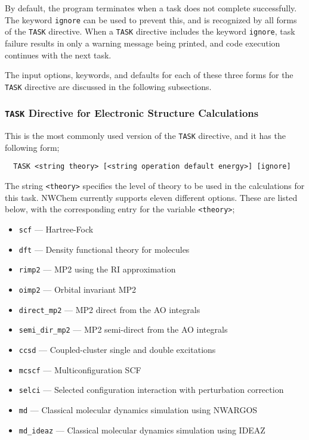 By default, the program terminates when a task does not complete
successfully.  The keyword \verb+ignore+ can be used to prevent this,
and is recognized by all forms of the \verb+TASK+ directive.  When a
\verb+TASK+ directive includes the keyword \verb+ignore+, task failure
results in only a warning message being printed, and code execution
continues with the next task.

The input options, keywords, and defaults for each of
these three forms for the \verb+TASK+ directive are discussed in the
following subsections.

\subsubsection{{\tt TASK} Directive for Electronic Structure Calculations}

This is the most commonly used version of the \verb+TASK+ directive, and
it has the following form;

\begin{verbatim}
  TASK <string theory> [<string operation default energy>] [ignore]
\end{verbatim}

The string \verb+<theory>+ specifies the level of theory to be used in the
calculations for this task.  NWChem currently supports eleven different
options.  These are listed below, with the corresponding entry for 
the variable {\tt <theory>};
\begin{itemize}
 \item \verb+scf+ --- Hartree-Fock
 \item \verb+dft+ --- Density functional theory for molecules
 \item \verb+rimp2+ --- MP2 using the RI approximation
 \item \verb+oimp2+ --- Orbital invariant MP2
 \item \verb+direct_mp2+ --- MP2 direct from the AO integrals
 \item \verb+semi_dir_mp2+ --- MP2 semi-direct from the AO integrals
 \item \verb+ccsd+ --- Coupled-cluster single and double excitations
 \item \verb+mcscf+ --- Multiconfiguration SCF
 \item \verb+selci+ --- Selected configuration interaction with perturbation
   correction 
 \item \verb+md+ --- Classical molecular dynamics simulation using NWARGOS
 \item \verb+md_ideaz+ --- Classical molecular dynamics simulation
   using IDEAZ
\end{itemize}

